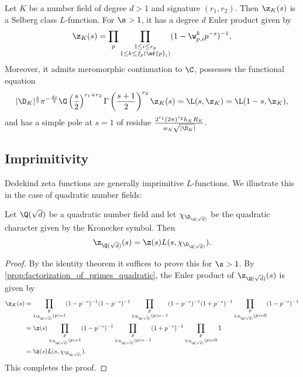       \begin{theorem}\label{thm:Dedekind_Selberg}
        Let $K$ be a number field of degree $d > 1$ and signature $(r_{1},r_{2})$. Then $\z_{K}(s)$ is a Selberg class $L$-function. For $\s > 1$, it has a degree $d$ Euler product given by
        \[
          \z_{K}(s) = \prod_{p}\prod_{\substack{1 \le i \le r_{p} \\ 1 \le k \le f_{p}(\mf{p}_{i})}}(1-\w_{p,i}^{k}p^{-s})^{-1},
        \]
        Moreover, it admits meromorphic continuation to $\C$, possesses the functional equation
        \[
          |\D_{K}|^{\frac{s}{2}}\pi^{-\frac{ds}{2}}\G\left(\frac{s}{2}\right)^{r_{1}+r_{2}}\Gamma\left(\frac{s+1}{2}\right)^{r_{2}}\z_{K}(s) = \L(s,\z_{K}) = \L(1-s,\z_{K}),
        \]
        and has a simple pole at $s = 1$ of residue $\frac{2^{r_{1}}(2\pi)^{r_{2}}h_{K}R_{K}}{w_{K}\sqrt{|\D_{K}|}}$.
      \end{theorem}
    \subsection*{Imprimitivity}
      Dedekind zeta functions are generally imprimitive $L$-functions. We illustrate this in the case of quadratic number fields:

      \begin{theorem}\label{thm:factorization_of_Dedekind_of_quadratic_number_field}
        Let $\Q(\sqrt{d})$ be a quadratic number field and let $\chi_{\D_{\Q(\sqrt{d})}}$ be the quadratic character given by the Kronecker symbol. Then
        \[
          \z_{\Q(\sqrt{d})}(s) = \z(s)L(s,\chi_{\D_{\Q(\sqrt{d})}}).
        \]
      \end{theorem}
      \begin{proof}
        By the identity theorem it suffices to prove this for $\s > 1$. By \cref{prop:factorization_of_primes_quadratic}, the Euler product of $\z_{\Q(\sqrt{d})}(s)$ is given by
        \begin{align*}
          \z_{K}(s) &= \prod_{\substack{p \\ \chi_{\D_{\Q(\sqrt{d})}}(p) = 1}}(1-p^{-s})^{-1}(1-p^{-s})^{-1}\prod_{\substack{p \\ \chi_{\D_{\Q(\sqrt{d})}}(p) = -1}}(1-p^{-s})^{-1}(1+p^{-s})^{-1}\prod_{\substack{p \\ \chi_{\D_{\Q(\sqrt{d})}}(p) = 0}}(1-p^{-s})^{-1} \\
          &= \z(s)\prod_{\substack{p \\ \chi_{\D_{\Q(\sqrt{d})}}(p) = 1}}(1-p^{-s})^{-1}\prod_{\substack{p \\ \chi_{\D_{\Q(\sqrt{d})}}(p) = -1}}(1+p^{-s})^{-1}\prod_{\substack{p \\ \chi_{\D_{\Q(\sqrt{d})}}(p) = 0}}1 \\
          &= \z(s)L(s,\chi_{\D_{\Q(\sqrt{d})}}).
        \end{align*}
        This completes the proof.
      \end{proof}


